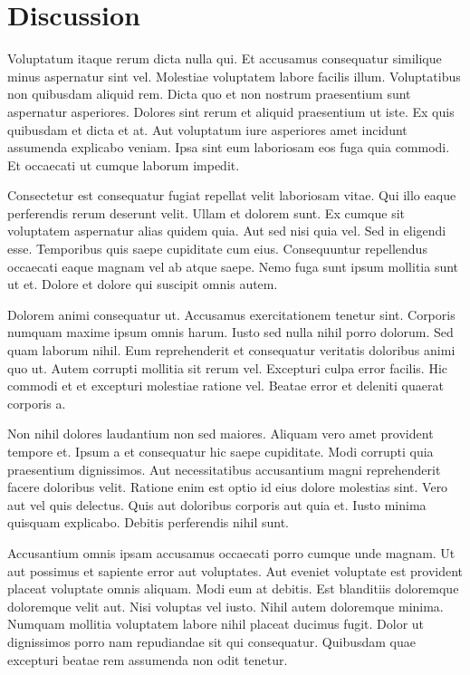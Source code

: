 \chapter{Discussion\label{discussion}}


Voluptatum itaque rerum dicta nulla qui. Et accusamus consequatur similique minus aspernatur sint vel. Molestiae voluptatem labore facilis illum. Voluptatibus non quibusdam aliquid rem. Dicta quo et non nostrum praesentium sunt aspernatur asperiores. Dolores sint rerum et aliquid praesentium ut iste. Ex quis quibusdam et dicta et at. Aut voluptatum iure asperiores amet incidunt assumenda explicabo veniam. Ipsa sint eum laboriosam eos fuga quia commodi. Et occaecati ut cumque laborum impedit.

Consectetur est consequatur fugiat repellat velit laboriosam vitae. Qui illo eaque perferendis rerum deserunt velit. Ullam et dolorem sunt. Ex cumque sit voluptatem aspernatur alias quidem quia. Aut sed nisi quia vel. Sed in eligendi esse. Temporibus quis saepe cupiditate cum eius. Consequuntur repellendus occaecati eaque magnam vel ab atque saepe. Nemo fuga sunt ipsum mollitia sunt ut et. Dolore et dolore qui suscipit omnis autem.

Dolorem animi consequatur ut. Accusamus exercitationem tenetur sint. Corporis numquam maxime ipsum omnis harum. Iusto sed nulla nihil porro dolorum. Sed quam laborum nihil. Eum reprehenderit et consequatur veritatis doloribus animi quo ut. Autem corrupti mollitia sit rerum vel. Excepturi culpa error facilis. Hic commodi et et excepturi molestiae ratione vel. Beatae error et deleniti quaerat corporis a.

Non nihil dolores laudantium non sed maiores. Aliquam vero amet provident tempore et. Ipsum a et consequatur hic saepe cupiditate. Modi corrupti quia praesentium dignissimos. Aut necessitatibus accusantium magni reprehenderit facere doloribus velit. Ratione enim est optio id eius dolore molestias sint. Vero aut vel quis delectus. Quis aut doloribus corporis aut quia et. Iusto minima quisquam explicabo. Debitis perferendis nihil sunt.

Accusantium omnis ipsam accusamus occaecati porro cumque unde magnam. Ut aut possimus et sapiente error aut voluptates. Aut eveniet voluptate est provident placeat voluptate omnis aliquam. Modi eum at debitis. Est blanditiis doloremque doloremque velit aut. Nisi voluptas vel iusto. Nihil autem doloremque minima. Numquam mollitia voluptatem labore nihil placeat ducimus fugit. Dolor ut dignissimos porro nam repudiandae sit qui consequatur. Quibusdam quae excepturi beatae rem assumenda non odit tenetur.

